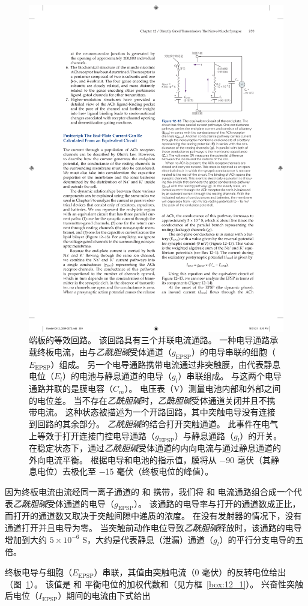\begin{figure}[htbp]
	\centering
	\includegraphics[width=0.6\linewidth]{chap12/fig_12_13}
	\caption{端板的等效回路。
		该回路具有三个并联电流通路。
		一种电导通路承载终板电流，由与\textit{乙酰胆碱}受体通道（$ g_{\text{EPSP}} $）的电导串联的细胞（$E_{\text{EPSP}}$）组成。
		另一个电导通路携带电流通过非突触膜，由代表静息电位（$ E_l $）的电池与静息通道的电导（$ g_l $）串联组成。
		与这两个电导通路并联的是膜电容（$ C_m $）。
		电压表（V）测量电池内部和外部之间的电位差。
		当不存在\textit{乙酰胆碱}时，\textit{乙酰胆碱}受体通道关闭并且不携带电流。
		这种状态被描述为一个开路回路，其中突触电导没有连接到回路的其余部分。
		\textit{乙酰胆碱}的结合打开突触通道。
		此事件在电气上等效于打开连接门控电导通路（$ g_{\text{EPSP}} $）与静息通路（$ g_l $）的开关。
		在稳定状态下，通过\textit{乙酰胆碱}受体通道的内向电流与通过静息通道的外向电流平衡。
		根据电导和电池的指示值，膜将从 −90 毫伏（其静息电位）去极化至 −15 毫伏（终板电位的峰值）。}
	\label{fig:12_13}
\end{figure}


因为终板电流由流经同一离子通道的  和  携带，我们将  和  电流通路组合成一个代表\textit{乙酰胆碱}受体通道的电导（$ g_{\text{EPSP}} $）。
该通路的电导率与打开的通道数成正比，而打开的通道数又取决于突触间隙中递质的浓度。
在没有发射器的情况下，没有通道打开并且电导为零。
当突触前动作电位导致\textit{乙酰胆碱}释放时，该通路的电导增加到大约 $ 5 \times 10^{-6} $ S，大约是代表静息（泄漏）通道（$ g_l $）的平行分支电导的五倍。


终板电导与细胞（$E_{\text{EPSP}}$）串联，其值由突触电流（0 毫伏）的反转电位给出（图~\ref{fig:12_13}）。
该值是  和  平衡电位的加权代数和（见方框~\ref{box:12_1}）。
兴奋性突触后电位（$I_{\text{EPSP}}$）期间的电流由下式给出


